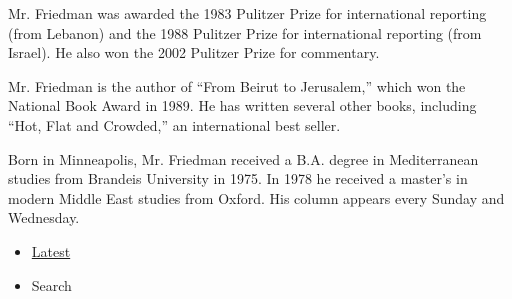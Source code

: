 Mr. Friedman was awarded the 1983 Pulitzer Prize for international
reporting (from Lebanon) and the 1988 Pulitzer Prize for international
reporting (from Israel). He also won the 2002 Pulitzer Prize for
commentary.

Mr. Friedman is the author of ``From Beirut to Jerusalem,'' which won
the National Book Award in 1989. He has written several other books,
including ``Hot, Flat and Crowded,'' an international best seller.

Born in Minneapolis, Mr. Friedman received a B.A. degree in
Mediterranean studies from Brandeis University in 1975. In 1978 he
received a master's in modern Middle East studies from Oxford. His
column appears every Sunday and Wednesday.

\begin{itemize}
\tightlist
\item
  \protect\hyperlink{stream-panel}{Latest}
\item
  Search
\end{itemize}

